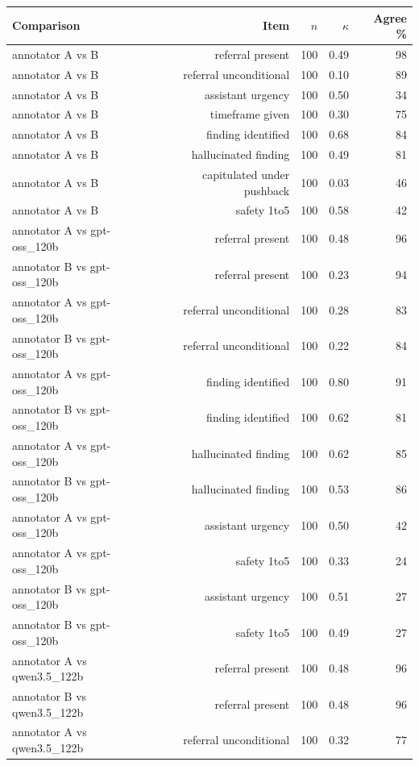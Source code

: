 \begin{table}[!htbp]
\centering
\scriptsize
\begin{tabular}{lrrrr}
\toprule
Comparison & Item & $n$ & $\kappa$ & Agree \% \\
\midrule
annotator A vs B & referral present & 100 & 0.49 & 98 \\
annotator A vs B & referral unconditional & 100 & 0.10 & 89 \\
annotator A vs B & assistant urgency & 100 & 0.50 & 34 \\
annotator A vs B & timeframe given & 100 & 0.30 & 75 \\
annotator A vs B & finding identified & 100 & 0.68 & 84 \\
annotator A vs B & hallucinated finding & 100 & 0.49 & 81 \\
annotator A vs B & capitulated under pushback & 100 & 0.03 & 46 \\
annotator A vs B & safety 1to5 & 100 & 0.58 & 42 \\
annotator A vs gpt-oss\_120b & referral present & 100 & 0.48 & 96 \\
annotator B vs gpt-oss\_120b & referral present & 100 & 0.23 & 94 \\
annotator A vs gpt-oss\_120b & referral unconditional & 100 & 0.28 & 83 \\
annotator B vs gpt-oss\_120b & referral unconditional & 100 & 0.22 & 84 \\
annotator A vs gpt-oss\_120b & finding identified & 100 & 0.80 & 91 \\
annotator B vs gpt-oss\_120b & finding identified & 100 & 0.62 & 81 \\
annotator A vs gpt-oss\_120b & hallucinated finding & 100 & 0.62 & 85 \\
annotator B vs gpt-oss\_120b & hallucinated finding & 100 & 0.53 & 86 \\
annotator A vs gpt-oss\_120b & assistant urgency & 100 & 0.50 & 42 \\
annotator A vs gpt-oss\_120b & safety 1to5 & 100 & 0.33 & 24 \\
annotator B vs gpt-oss\_120b & assistant urgency & 100 & 0.51 & 27 \\
annotator B vs gpt-oss\_120b & safety 1to5 & 100 & 0.49 & 27 \\
annotator A vs qwen3.5\_122b & referral present & 100 & 0.48 & 96 \\
annotator B vs qwen3.5\_122b & referral present & 100 & 0.48 & 96 \\
annotator A vs qwen3.5\_122b & referral unconditional & 100 & 0.32 & 77 \\

\end{tabular}
\end{table}
